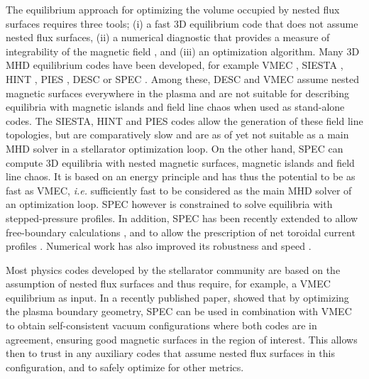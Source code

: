 The equilibrium approach for optimizing the volume occupied by nested flux surfaces requires three tools; (i) a fast 3D equilibrium code that does not assume nested flux surfaces, (ii) a numerical diagnostic that provides a measure of integrability of the magnetic field \citep{Meiss1992c,MacKay1985,Greene1978,Loizu2017}, and (iii) an optimization algorithm.
Many \ac{3D} \ac{MHD} equilibrium codes have been developed, for example VMEC \citep{Hirshman1983,Hirshman1986}, SIESTA \citep{Hirshman2008,Peraza-Rodriguez2017}, HINT \citep{Harafuji1989,Suzuki2006}, PIES \citep{Reiman1986,Drevlak2005}, DESC \citep{Dudt2020} or \ac{SPEC} \citep{Hudson2012}. Among these, DESC and VMEC assume nested magnetic surfaces everywhere in the plasma and are not suitable for describing equilibria with magnetic islands and field line chaos when used as stand-alone codes. The SIESTA, HINT and PIES codes allow the generation of these field line topologies, but are comparatively slow and are as of yet not suitable as a main \ac{MHD} solver in a stellarator optimization loop.
On the other hand, \ac{SPEC} can compute 3D equilibria with nested magnetic surfaces, magnetic islands and field line chaos. It is based on an energy principle and has thus the potential to be as fast as VMEC, \textit{i.e.} sufficiently fast to be considered as the main \ac{MHD} solver of an optimization loop. \ac{SPEC} however is constrained to solve equilibria with stepped-pressure profiles. In addition, \ac{SPEC} has been recently extended to allow free-boundary calculations \citep{Hudson2020c}, and to allow the prescription of net toroidal current profiles \citep{Baillod2021}. Numerical work has also improved its robustness and speed \citep{Qu2020}.

Most physics codes developed by the stellarator community are based on the assumption of nested flux surfaces and thus require, for example, a VMEC equilibrium as input. In a recently published paper, \citet{Landreman2021a} showed that by optimizing the plasma boundary geometry, \ac{SPEC} can be used in combination with VMEC to obtain self-consistent vacuum configurations where both codes are in agreement, ensuring good magnetic surfaces in the region of interest. This allows then to trust in any auxiliary codes that assume nested flux surfaces in this configuration, and to safely optimize for other metrics. 

